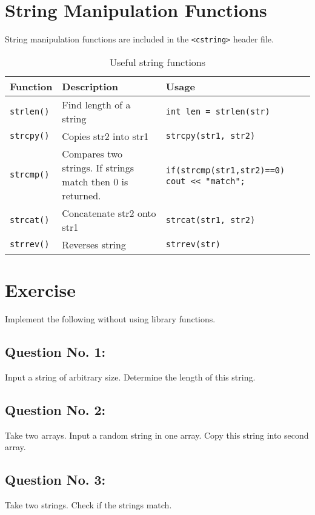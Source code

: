 \documentclass[12pt,a4paper]{article}
\begin{document}
\section{String Manipulation Functions}
String manipulation functions are included in the \verb|<cstring>| header file. 
\begin{table}[H]
\begin{center}
\vspace{0.3cm}
	\begin{tabular}{lp{5cm}p{5cm}}
	\hline \hline
		\textbf{Function} \rule{0pt}{2.6ex} & \textbf{Description} & \textbf{Usage}\\
		\hline
		\verb|strlen()| \rule{0pt}{2.6ex} & Find length of a string & \verb|int len = strlen(str)|\\
		\verb|strcpy()| & Copies str2 into str1 & \verb|strcpy(str1, str2)|\\
		\verb|strcmp()| & Compares two strings. If strings match then 0 is returned. & \verb|if(strcmp(str1,str2)==0)| \verb|    cout << "match";|\\
		\verb|strcat()| & Concatenate str2 onto str1 & \verb|strcat(str1, str2)|\\
		\verb|strrev()| & Reverses string & \verb|strrev(str)|\\
	\hline \hline
	\end{tabular}
\end{center}
\label{Useful string functions}
\caption{Useful string functions}
\end{table}
\section{Exercise}
Implement the following without using library functions.
\subsection{Question No. 1:} Input a string of arbitrary size. Determine the length of this string.
\subsection{Question No. 2:} Take two arrays. Input a random string in one array. Copy this string into second array.
\subsection{Question No. 3:} Take two strings. Check if the strings match.
\end{document}
